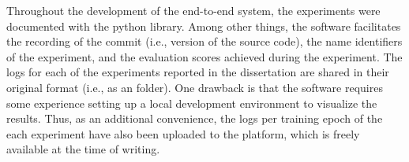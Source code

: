 
Throughout the development of the end-to-end system, the
experiments were documented with the 
 python library. Among other
things, the software facilitates the recording of the
 commit (i.e., version of the source code), the
name identifiers of the experiment, and the evaluation
scores achieved during the experiment. The logs for each of
the experiments reported in the dissertation are shared in
their original  format (i.e., as an
 folder). One drawback is that the software
requires some experience setting up a local development
environment to visualize the results. Thus, as an additional
convenience, the logs per training epoch of the each
experiment have also been uploaded to the
platform, which is
freely available at the time of writing.

